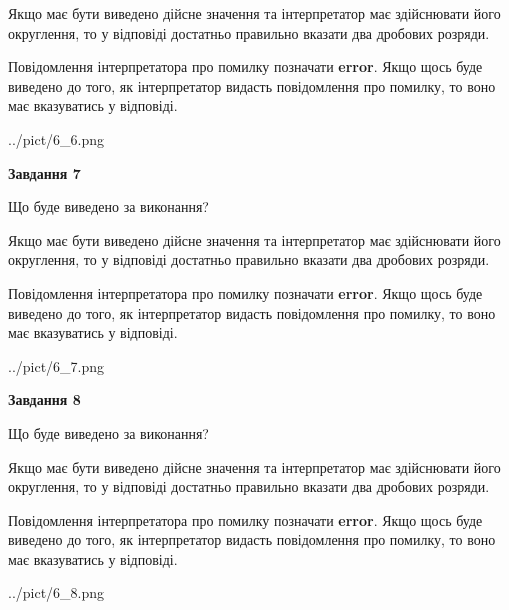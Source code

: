 \documentclass[12pt, ukrainian]{article}
\begin{document}
{\begin {Large}
Якщо має бути виведено дійсне значення та інтерпретатор має здійснювати його округлення, 
то у відповіді достатньо правильно вказати два дробових розряди.

Повідомлення інтерпретатора про помилку позначати \textbf{error}.
Якщо щось буде виведено до того, як інтерпретатор видасть повідомлення про помилку, 
то воно має вказуватись у відповіді. \par

\begin{center}
	{../pict/6_6.png}
\end{center}
\newpage

{\begin {center}\textbf{Завдання 7}\end {center}}\par
Що буде виведено за виконання? \par

Якщо має бути виведено дійсне значення та інтерпретатор має здійснювати його округлення, 
то у відповіді достатньо правильно вказати два дробових розряди.

Повідомлення інтерпретатора про помилку позначати \textbf{error}.
Якщо щось буде виведено до того, як інтерпретатор видасть повідомлення про помилку, 
то воно має вказуватись у відповіді. \par

\begin{center}
	{../pict/6_7.png}
\end{center}
\newpage

{\begin {center}\textbf{Завдання 8}\end {center}}\par
Що буде виведено за виконання? \par

Якщо має бути виведено дійсне значення та інтерпретатор має здійснювати його округлення, 
то у відповіді достатньо правильно вказати два дробових розряди.

Повідомлення інтерпретатора про помилку позначати \textbf{error}.
Якщо щось буде виведено до того, як інтерпретатор видасть повідомлення про помилку, 
то воно має вказуватись у відповіді. \par

\begin{center}
	{../pict/6_8.png}
\end{center}
\newpage


\end{Large}}
\end{document}
